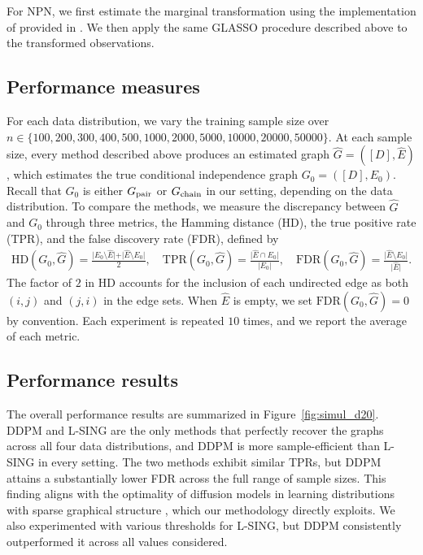\documentclass[11pt,a4paper,final]{article}
\numberwithin{equation}{section}
\theoremstyle{remark}
\newcommand{\bx}{{\bf x}}
\newcommand{\bean}{\setlength\arraycolsep{1pt}\begin{eqnarray*}}
\newcommand{\eean}{\end{eqnarray*}}
\begin{document}
For NPN, we first estimate the marginal transformation using the implementation of \cite{liu2009nonparanormal} provided in \cite{zhao2012huge}.
We then apply the same GLASSO procedure described above to the transformed observations.


\subsection{Performance measures}

For each data distribution, we vary the training sample size over $n \in \{100,\allowbreak 200,\allowbreak 300,\allowbreak 400,\allowbreak 500,\allowbreak 1000,\allowbreak 2000,\allowbreak 5000,\allowbreak 10000,\allowbreak 20000,\allowbreak 50000\}$.
At each sample size, every method described above produces an estimated graph $\widehat G = ([D], \widehat E)$, which estimates the true conditional independence graph $G_{0} = ([D], E_{0})$.
Recall that $G_{0}$ is either $G_{\rm pair}$ or $G_{\rm chain}$ in our setting, depending on the data distribution.
To compare the methods, we measure the discrepancy between $\widehat G$ and $G_{0}$ through three metrics, the Hamming distance (HD), the true positive rate (TPR), and the false discovery rate (FDR), defined by
\bean
\mathrm{HD}(G_{0}, \widehat G) = \frac{\vert E_{0} \setminus \widehat E \vert + \vert \widehat E \setminus E_{0} \vert}{2}, \quad
\mathrm{TPR}(G_{0}, \widehat G) = \frac{\vert \widehat E \cap E_{0} \vert}{\vert E_{0} \vert}, \quad
\mathrm{FDR}(G_{0}, \widehat G) = \frac{\vert \widehat E \setminus E_{0} \vert}{\vert \widehat E \vert}.
\eean
The factor of $2$ in HD accounts for the inclusion of each undirected edge as both $(i, j)$ and $(j, i)$ in the edge sets.
When $\widehat E$ is empty, we set $\mathrm{FDR}(G_{0}, \widehat G) = 0$ by convention.
Each experiment is repeated $10$ times, and we report the average of each metric.



\subsection{Performance results}

The overall performance results are summarized in Figure~\ref{fig:simul_d20}.
DDPM and L-SING are the only methods that perfectly recover the graphs across all four data distributions, and DDPM is more sample-efficient than L-SING in every setting.
The two methods exhibit similar TPRs, but DDPM attains a substantially lower FDR across the full range of sample sizes.
This finding aligns with the optimality of diffusion models in learning distributions with sparse graphical structure \citep{kwon2026nonparametric}, which our methodology directly exploits.
We also experimented with various thresholds for L-SING, but DDPM consistently outperformed it across all values considered.
\end{document}
